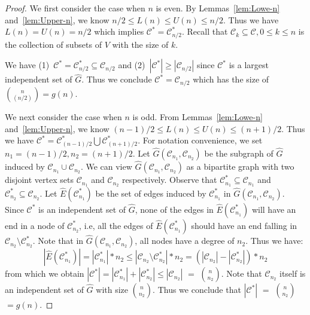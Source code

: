 \documentclass[11pt,letterpaper]{article}
\begin{document}
\begin{proof}
We first consider the case when $n$ is even.
By Lemmas~\ref{lem:Lowe-n} and~\ref{lem:Upper-n}, we know
$n/2 \le L(n) \le U(n) \le n/2$. Thus we have
$L(n)=U(n)=n/2$ which implies $ \mathcal{C}^*= \mathcal{C}^*_{n/2}$.
Recall that $ \mathcal{C}_k\subseteq \mathcal{C} , 0 \le k \le n$ is the collection
of subsets of $V$ with the size of $k$.

We have (1)~$\mathcal{C}^*= \mathcal{C}^*_{n/2} \subseteq \mathcal{C}_{n/2}$ and
(2)~$|\mathcal{C}^*| \ge |\mathcal{C}_{n/2}| $ since
$\mathcal{C}^*$ is a largest independent set of $\widehat{G}$.
Thus we conclude $\mathcal{C}^*=\mathcal{C}_{n/2}$ which has the size
of ${n \choose (n/2)} = g(n)$.

We next consider the case when $n$ is odd. From
Lemmas~\ref{lem:Lowe-n} and~\ref{lem:Upper-n}, we know
$(n-1)/2 \le L(n) \le U(n) \le (n+1)/2$. Thus we have
$ \mathcal{C}^*= \mathcal{C}^*_{(n-1)/2} \bigcup \mathcal{C}^*_{(n+1)/2}$.
For notation convenience, we set $n_1=(n-1)/2, n_2=(n+1)/2$.
Let $\widehat{G}(\mathcal{C}_{n_1}, \mathcal{C}_{n_2})$ be the subgraph of $\widehat{G}$
induced by $\mathcal{C}_{n_1} \cup \mathcal{C}_{n_2}$. We can view
$\widehat{G}(\mathcal{C}_{n_1}, \mathcal{C}_{n_2})$ as a bipartite graph with two
disjoint vertex sets $\mathcal{C}_{n_1}$ and $\mathcal{C}_{n_2}$ respectively.
Observe that $\mathcal{C}^*_{n_1} \subseteq \mathcal{C}_{n_1}$
 and $\mathcal{C}^*_{n_2} \subseteq\mathcal{C}_{n_2}$.
Let $\widehat{E} (\mathcal{C}^*_{n_1})$
be the set of edges induced by $\mathcal{C}^*_{n_1}$ in
$\widehat{G}(\mathcal{C}_{n_1}, \mathcal{C}_{n_2})$. Since
$\mathcal{C}^*$ is an independent set of $\widehat{G}$,
none of the edges in $\widehat{E} (\mathcal{C}^*_{n_1})$
will have an end in a node of $\mathcal{C}^*_{n_2}$, i.e,
all the edges of $\widehat{E} (\mathcal{C}^*_{n_1})$ should have
an end  falling in $\mathcal{C}_{n_2} \setminus \mathcal{C}^*_{n_2}$.
Note that in $\widehat{G}(\mathcal{C}_{n_1}, \mathcal{C}_{n_2})$, all nodes
have a degree of $n_2$. Thus we have:
$$
|\widehat{E} (\mathcal{C}^*_{n_1})|=|\mathcal{C}^*_{n_1}|*n_2 \le |\mathcal{C}_{n_2} \setminus \mathcal{C}^*_{n_2}|*n_2= (|\mathcal{C}_{n_2}|-|\mathcal{C}^*_{n_2}|)*n_2
$$
from which we obtain $|\mathcal{C}^*|=|\mathcal{C}^*_{n_1}|+|\mathcal{C}^*_{n_2}| \le |\mathcal{C}_{n_2}|$ $=$ ${n} \choose n_2$.
Note that $\mathcal{C}_{n_2}$ itself is an independent set of
$\widehat{G}$ with size $n \choose n_2$.
Thus we conclude that $|\mathcal{C}^*|$ $=$ ${n} \choose n_2$ $= g(n)$.
\end{proof}
\end{document}
